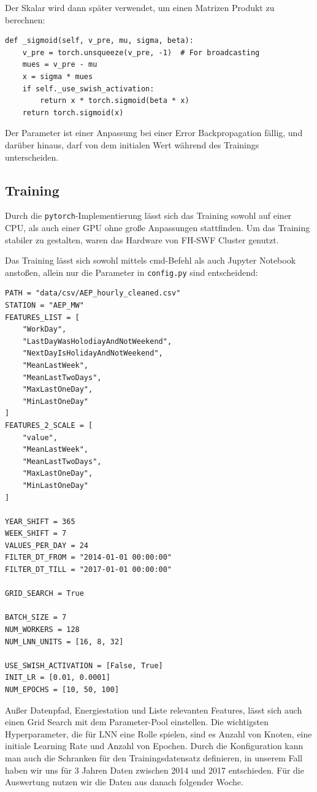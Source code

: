 \documentclass[11pt,ngerman,a4paper,]{article}
\begin{document}
Der Skalar wird dann später verwendet, um einen Matrizen Produkt zu berechnen:

\begin{verbatim}
def _sigmoid(self, v_pre, mu, sigma, beta):
    v_pre = torch.unsqueeze(v_pre, -1)  # For broadcasting
    mues = v_pre - mu
    x = sigma * mues
    if self._use_swish_activation:
        return x * torch.sigmoid(beta * x)
    return torch.sigmoid(x)
\end{verbatim}

Der Parameter ist einer Anpassung bei einer Error Backpropagation fällig, und darüber hinaus, darf von dem initialen Wert während des Trainings unterscheiden.

\subsection{Training}\label{training}

Durch die \texttt{pytorch}-Implementierung lässt sich das Training sowohl auf einer CPU, als auch einer GPU ohne große Anpassungen stattfinden. Um das Training stabiler zu gestalten, waren das Hardware von FH-SWF Cluster genutzt.

Das Training lässt sich sowohl mittels cmd-Befehl als auch Jupyter Notebook anstoßen, allein nur die Parameter in \texttt{config.py} sind entscheidend:

\begin{verbatim}
PATH = "data/csv/AEP_hourly_cleaned.csv"
STATION = "AEP_MW"
FEATURES_LIST = [
    "WorkDay",
    "LastDayWasHolodiayAndNotWeekend",
    "NextDayIsHolidayAndNotWeekend",
    "MeanLastWeek",
    "MeanLastTwoDays",
    "MaxLastOneDay",
    "MinLastOneDay"
]
FEATURES_2_SCALE = [
    "value",
    "MeanLastWeek",
    "MeanLastTwoDays",
    "MaxLastOneDay",
    "MinLastOneDay"
]

YEAR_SHIFT = 365
WEEK_SHIFT = 7
VALUES_PER_DAY = 24
FILTER_DT_FROM = "2014-01-01 00:00:00"
FILTER_DT_TILL = "2017-01-01 00:00:00"

GRID_SEARCH = True

BATCH_SIZE = 7
NUM_WORKERS = 128
NUM_LNN_UNITS = [16, 8, 32]

USE_SWISH_ACTIVATION = [False, True]
INIT_LR = [0.01, 0.0001]
NUM_EPOCHS = [10, 50, 100]
\end{verbatim}

Außer Datenpfad, Energiestation und Liste relevanten Features, lässt sich auch einen Grid Search mit dem Parameter-Pool einstellen. Die wichtigsten Hyperparameter, die für LNN eine Rolle spielen, sind es Anzahl von Knoten, eine initiale Learning Rate und Anzahl von Epochen. Durch die
Konfiguration kann man auch die Schranken für den Trainingsdatensatz definieren, in unserem Fall haben wir uns für 3 Jahren Daten zwischen 2014 und 2017 entschieden. Für die Auswertung nutzen wir die Daten aus danach folgender Woche.
\end{document}
